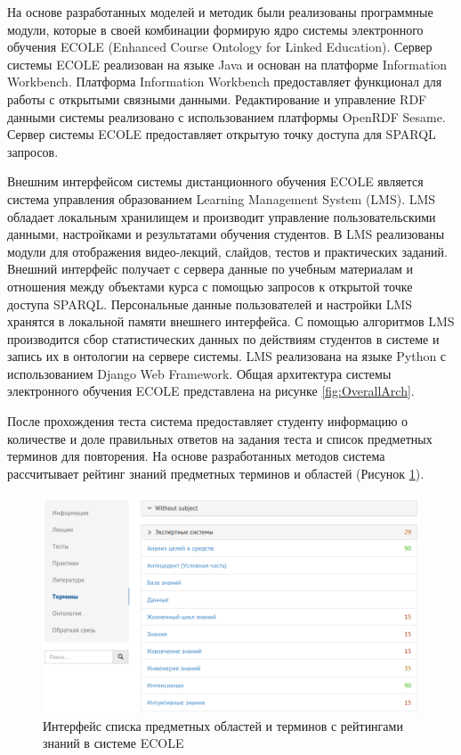 На основе разработанных моделей и методик были реализованы программные модули, которые в своей комбинации формирую ядро системы электронного обучения ECOLE (Enhanced Course Ontology for Linked Education). Сервер системы ECOLE реализован на языке Java и основан на платформе Information Workbench. Платформа Information Workbench предоставляет функционал для работы с открытыми связными данными. Редактирование и управление RDF данными системы реализовано с использованием платформы OpenRDF Sesame. Сервер системы ECOLE предоставляет открытую точку доступа для SPARQL запросов. 

Внешним интерфейсом системы дистанционного обучения ECOLE является система управления образованием Learning Management System (LMS). LMS обладает локальным хранилищем и производит управление пользовательскими данными, настройками и результатами обучения студентов. В LMS реализованы модули для отображения видео-лекций, слайдов, тестов и практических заданий. Внешний интерфейс получает с сервера данные по учебным материалам и отношения между объектами курса с помощью запросов к открытой точке доступа SPARQL. Персональные данные пользователей и настройки LMS хранятся в локальной памяти внешнего интерфейса. С помощью алгоритмов LMS производится сбор статистических данных по действиям студентов в системе и запись их в онтологии на сервере системы. LMS реализована на языке Python с использованием Django Web Framework. Общая архитектура системы электронного обучения ECOLE представлена на рисунке \ref{fig:OverallArch}.



После прохождения теста система предоставляет студенту информацию о количестве и доле правильных ответов на задания теста и список предметных терминов для повторения. На основе разработанных методов система рассчитывает рейтинг знаний предметных терминов и областей (Рисунок \ref{fig:screen2}).

\begin{figure}[ht] 
  \center
  \includegraphics[scale=0.40]{screen2}
  \caption {Интерфейс списка предметных областей и терминов с рейтингами знаний в системе ECOLE} 
  \label{fig:screen2}
\end{figure}



